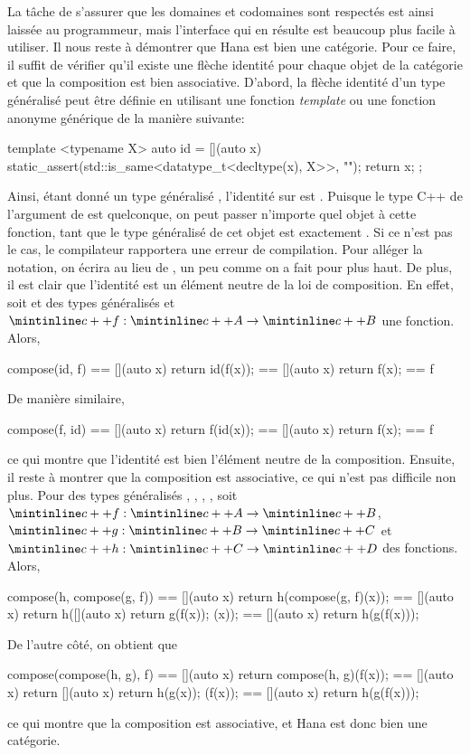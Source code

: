 La tâche de s'assurer que les domaines et codomaines sont respectés est ainsi
laissée au programmeur, mais l'interface qui en résulte est beaucoup plus
facile à utiliser. Il nous reste à démontrer que Hana est bien une catégorie.
Pour ce faire, il suffit de vérifier qu'il existe une flèche identité pour
chaque objet de la catégorie et que la composition est bien associative.
D'abord, la flèche identité d'un type généralisé peut être définie en
utilisant une fonction \textit{template} ou une fonction anonyme générique
de la manière suivante:
\begin{cpp}
    template <typename X>
    auto id = [](auto x) {
        static_assert(std::is_same<datatype_t<decltype(x), X>>{}, "");
        return x;
    };
\end{cpp}

Ainsi, étant donné un type généralisé , l'identité sur  est
. Puisque le type C++ de l'argument de  est quelconque,
on peut passer n'importe quel objet à cette fonction, tant que le type
généralisé de cet objet est exactement . Si ce n'est pas le cas,
le compilateur rapportera une erreur de compilation. Pour alléger la
notation, on écrira  au lieu de , un peu comme on a
fait pour  plus haut. De plus, il est clair que l'identité
est un élément neutre de la loi de composition. En effet, soit
 et  des types généralisés et $\cc{f} : \cc{A} \to \cc{B}$
une fonction. Alors,
\begin{cpp}
    compose(id, f) == [](auto x) { return id(f(x)); }
                   == [](auto x) { return f(x); }
                   == f
\end{cpp}

De manière similaire,
\begin{cpp}
    compose(f, id) == [](auto x) { return f(id(x)); }
                   == [](auto x) { return f(x); }
                   == f
\end{cpp}

ce qui montre que l'identité est bien l'élément neutre de la composition.
Ensuite, il reste à montrer que la composition est associative, ce qui n'est
pas difficile non plus. Pour des types généralisés , , ,
, soit $\cc{f} : \cc{A} \to \cc{B}$, $\cc{g} : \cc{B} \to \cc{C}$ et
$\cc{h} : \cc{C} \to \cc{D}$ des fonctions. Alors,
\begin{cpp}
    compose(h, compose(g, f))
        == [](auto x) { return h(compose(g, f)(x)); }
        == [](auto x) { return h([](auto x) { return g(f(x)); }(x)); }
        == [](auto x) { return h(g(f(x))); }
\end{cpp}

De l'autre côté, on obtient que
\begin{cpp}
    compose(compose(h, g), f)
        == [](auto x) { return compose(h, g)(f(x)); }
        == [](auto x) { return [](auto x) { return h(g(x)); }(f(x)); }
        == [](auto x) { return h(g(f(x))); }
\end{cpp}

ce qui montre que la composition est associative, et Hana est donc bien une
catégorie.
